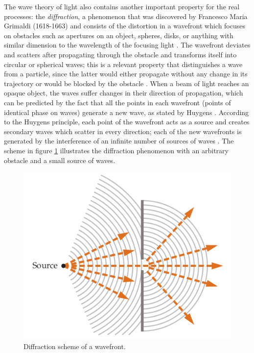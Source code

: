 The wave theory of light also contains another important property for the real processes: the \emph{diffraction}, a phenomenon that was discovered by Francesco Maria Grimaldi (1618-1663) and consists of the distortion in a wavefront which focuses on obstacles such as apertures on an object, spheres, disks, or anything with similar dimension to the wavelength of the focusing light \cite{zilio2009optica}. The wavefront deviates and scatters after propagating through the obstacle and transforms itself into circular or spherical waves; this is a relevant property that distinguishes a wave from a particle, since the latter would either propagate without any change in its trajectory or would be blocked by the obstacle \cite{tipler2007physics}. When a beam of light reaches an opaque object, the waves suffer changes in their direction of propagation, which can be predicted by the fact that all the points in each wavefront (points of identical phase on waves) generate a new wave, as stated by Huygens \cite{fowles1989introduction}. According to the Huygens principle, each point of the wavefront acts as a source and creates secondary waves which scatter in every direction; each of the new wavefronts is generated by the interference of an infinite number of sources of waves \cite{zilio2009optica}. The scheme in figure \ref{fig:diffraction} illustrates the diffraction phenomenon with an arbitrary obstacle and a small source of waves.

\begin{figure}[htb]
	\centering
	\caption{\label{fig:diffraction} Diffraction scheme of a wavefront.}
	\begin{center}
	    \includegraphics[scale=0.5]{images/diffraction.png}
	\end{center}
	\centering
\end{figure}


